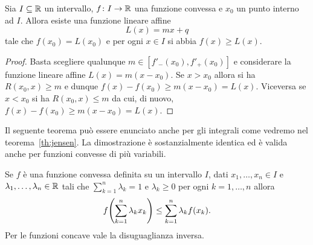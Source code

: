   \begin{theorem}
    \label{th:supporto_convessa}%
    Sia $I\subseteq {\mathbb R}$ un intervallo, $f\colon I\to{\mathbb R}$ una funzione convessa 
    e $x_0$ un punto interno ad $I$. Allora esiste una funzione lineare affine 
    \[
      L(x) = mx+q
    \]
    tale che $f(x_0) = L(x_0)$ e per ogni $x\in I$ si abbia $f(x)\ge L(x)$.
  \end{theorem}
  \begin{proof}
    Basta scegliere qualunque $m\in [f'_-(x_0),f'_+(x_0)]$ e considerare la funzione 
    lineare affine $L(x) = m(x-x_0)$. Se $x>x_0$ allora si ha $R(x_0,x)\ge m$ 
    e dunque $f(x) - f(x_0) \ge m (x-x_0) = L(x)$. Viceversa se $x<x_0$ 
    si ha $R(x_0,x)\le m$ da cui, di nuovo, $f(x)-f(x_0) \ge m(x-x_0) = L(x)$.
  \end{proof}
  Il seguente teorema può essere enunciato anche per gli integrali 
  come vedremo nel teorema~\ref{th:jensen}. 
  La dimostrazione è sostanzialmente identica ed è valida anche 
  per funzioni convesse di più variabili.
  \begin{theorem}
    \mymark{*}%
    \label{th:combinazioni_baricentriche}%
    Se $f$ è una funzione convessa definita su un intervallo $I$, dati $x_1, \dots, x_n \in I$ e $\lambda_1, \dots, \lambda_n\in {\mathbb R}$ tali che $\sum_{k=1}^n \lambda_k = 1$ e $\lambda_k \ge 0$ per ogni $k=1, \dots, n$ allora
    \[
      f{\left( \sum_{k=1}^n \lambda_k x_k \right)}
      \le \sum_{k=1}^n \lambda_k f(x_k).
    \]
    Per le funzioni concave vale la disuguaglianza inversa.
    \end{theorem}
